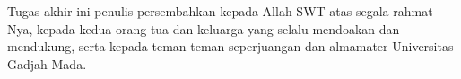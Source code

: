 \vspace{5cm}

\begin{center}
	Tugas akhir ini penulis persembahkan kepada Allah SWT atas segala rahmat-Nya, kepada kedua orang tua dan keluarga yang selalu mendoakan dan mendukung, serta kepada teman-teman seperjuangan dan almamater Universitas Gadjah Mada.
\end{center}
